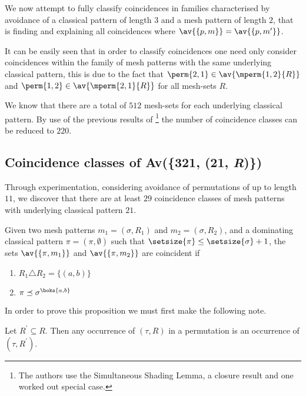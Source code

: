 We now attempt to fully classify coincidences in families characterised by avoidance
of a classical pattern of length \(3\) and a mesh pattern of length \(2\), that is
finding and explaining all coincidences where \(\av{\{p,m\}} = \av{\{p,m^\prime\}}\).

It can be easily seen that in order to classify coincidences one need only
consider coincidences within the family of mesh patterns with the same underlying
classical pattern, this is due to the fact that \(\perm{2,1}\in\av{\mperm{1,2}{R}}\)
and \(\perm{1,2}\in\av{\mperm{2,1}{R}}\) for all mesh-sets \(R\).

We know that there are a total of \(512\) mesh-sets for each underlying classical
pattern. By use of the previous results of \textcite{DBLP:journals/corr/ClaessonTU14}\footnote{
The authors use the Simultaneous Shading Lemma, a closure result and one worked out special case.
} the number of coincidence classes can be reduced to \(220\).

\subsection{Coincidence classes of Av(\{321, (21, \textit{R})\})}
Through experimentation, considering avoidance of permutations of up to length \(11\), we discover
that there are at least \(29\) coincidence classes of mesh patterns with underlying classical
pattern \(21\).

\begin{proposition}
    \label{prop:dom1}
    Given two mesh patterns \(m_1 =(\sigma, R_1)\) and \(m_2 = (\sigma, R_2)\),
    and a dominating classical pattern \(\pi = (\pi,\emptyset)\) such that
    \(\setsize{\pi} \le \setsize{\sigma} + 1\), the sets \(\av{\{\pi,m_1\}}\) and
    \(\av{\{\pi,m_2\}}\) are coincident if

    \begin{enumerate}
        \item \(R_1 \triangle R_2 = \{(a,b)\}\)
        \item \(\pi \preceq \sigma^\boks{a,b}\)\label{prop:dom1:cont}
    \end{enumerate}
\end{proposition}
In order to prove this proposition we must first make the following note.

\begin{note}
    \label{not:downcmesh}
    Let \(R^\prime \subseteq R\). Then any occurrence of \((\tau, R)\) in a permutation
    is an occurrence of \((\tau,R^\prime)\).
\end{note}

